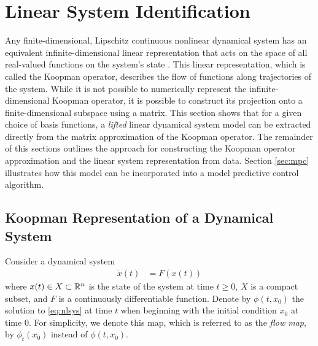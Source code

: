 \section{Linear System Identification}
\label{sec:sysid}

Any finite-dimensional, Lipschitz continuous nonlinear dynamical system has an equivalent infinite-dimensional linear representation that acts on the space of all real-valued functions on the system's state \cite[Definition 3.3.1]{lasota2013chaos}.
This linear representation, which is called the Koopman operator, describes the flow of functions along trajectories of the system.
While it is not possible to numerically represent the infinite-dimensional Koopman operator, it is possible to construct its projection onto a finite-dimensional subspace using a matrix.
This section shows that for a given choice of basis functions, a \emph{lifted} linear dynamical system model can be extracted directly from the matrix approximation of the Koopman operator.
The remainder of this sections outlines the approach for constructing the Koopman operator approximation and the linear system representation from data.
Section \ref{sec:mpc} illustrates how this model can be incorporated into a model predictive control algorithm.

\subsection{Koopman Representation of a Dynamical System}

Consider a dynamical system
\begin{align}
    \dot{x}(t) &= F (x(t))
    \label{eq:nlsys}
\end{align}
where $x(t) \in X \subset \mathbb{R}^n$ is the state of the system at time $t \geq 0$, $X$ is a compact subset, and ${F}$ is a continuously differentiable function.
Denote by $\phi(t,x_0)$ the solution to \eqref{eq:nlsys} at time $t$ when beginning with the initial condition $x_0$ at time $0$.
For simplicity, we denote this map, which is referred to as the \emph{flow map}, by $\phi_t (x_0)$ instead of $\phi (t, x_0)$.


